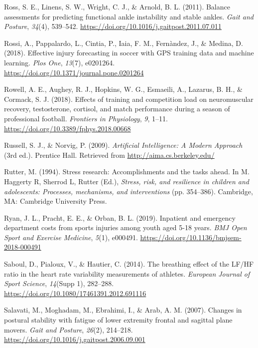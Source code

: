 \documentclass[man,floatsintext]{apa6}
\begin{document}
\leavevmode\hypertarget{ref-Ross2011}{}%
Ross, S. E., Linens, S. W., Wright, C. J., \& Arnold, B. L. (2011). Balance assessments for predicting functional ankle instability and stable ankles. \emph{Gait and Posture}, \emph{34}(4), 539--542. \url{https://doi.org/10.1016/j.gaitpost.2011.07.011}

\leavevmode\hypertarget{ref-Rossi2018}{}%
Rossi, A., Pappalardo, L., Cintia, P., Iaia, F. M., Fernàndez, J., \& Medina, D. (2018). Effective injury forecasting in soccer with GPS training data and machine learning. \emph{Plos One}, \emph{13}(7), e0201264. \url{https://doi.org/10.1371/journal.pone.0201264}

\leavevmode\hypertarget{ref-Rowell2018}{}%
Rowell, A. E., Aughey, R. J., Hopkins, W. G., Esmaeili, A., Lazarus, B. H., \& Cormack, S. J. (2018). Effects of training and competition load on neuromuscular recovery, testosterone, cortisol, and match performance during a season of professional football. \emph{Frontiers in Physiology}, \emph{9}, 1--11. \url{https://doi.org/10.3389/fphys.2018.00668}

\leavevmode\hypertarget{ref-Norvig2009}{}%
Russell, S. J., \& Norvig, P. (2009). \emph{Artificial Intelligence: A Modern Approach} (3rd ed.). Prentice Hall. Retrieved from \url{http://aima.cs.berkeley.edu/}

\leavevmode\hypertarget{ref-Rutter1994}{}%
Rutter, M. (1994). Stress research: Accomplishments and the tasks ahead. In M. Haggerty R, Sherrod L, Rutter (Ed.), \emph{Stress, risk, and resilience in children and adolescents: Processes, mechanisms, and interventions} (pp. 354--386). Cambridge, MA: Cambridge University Press.

\leavevmode\hypertarget{ref-Ryan2019}{}%
Ryan, J. L., Pracht, E. E., \& Orban, B. L. (2019). Inpatient and emergency department costs from sports injuries among youth aged 5-18 years. \emph{BMJ Open Sport and Exercise Medicine}, \emph{5}(1), e000491. \url{https://doi.org/10.1136/bmjsem-2018-000491}

\leavevmode\hypertarget{ref-Saboul2014}{}%
Saboul, D., Pialoux, V., \& Hautier, C. (2014). The breathing effect of the LF/HF ratio in the heart rate variability measurements of athletes. \emph{European Journal of Sport Science}, \emph{14}(Supp 1), 282--288. \url{https://doi.org/10.1080/17461391.2012.691116}

\leavevmode\hypertarget{ref-Salavati2007}{}%
Salavati, M., Moghadam, M., Ebrahimi, I., \& Arab, A. M. (2007). Changes in postural stability with fatigue of lower extremity frontal and sagittal plane movers. \emph{Gait and Posture}, \emph{26}(2), 214--218. \url{https://doi.org/10.1016/j.gaitpost.2006.09.001}
\end{document}
